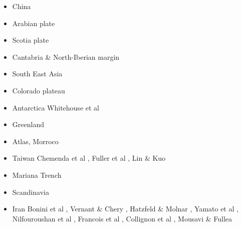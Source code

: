 \begin{itemize}
\item China 
{\scriptsize
\cite{zhst10}
\cite{wazh15}
\cite{guyr16}
\cite{dawl20}
}
\item Arabian plate 
{\scriptsize
\cite{rerl15}
}
\item Scotia plate 
{\scriptsize
\cite{necb13}
}
\item Cantabria \& North-Iberian margin 
{\scriptsize
\cite{clbb02}
\cite{peap15}
}
\item South East Asia 
{\scriptsize
\cite{rekv04}
\cite{yotr15}\cite{hasp15}\cite{meds15}
\cite{necg16}
}
\item Colorado plateau 
{\scriptsize
\cite{vabv10}
\cite{lesm11}
}
\item Antarctica  
{\scriptsize
\cite{huha07}
Whitehouse et al \cite{whbl12}
}
\item Greenland  
{\scriptsize
\cite{stsj15}\cite{heps15}\cite{stbl19}
}
\item Atlas, Morroco  
{\scriptsize
\cite{mica12}
\cite{kava14}
}
\item Taiwan  
{\scriptsize
Chemenda et al \cite{chys01}, Fuller et al \cite{fuwf06}, Lin \& Kuo \cite{liku16}
}
\item Mariana Trench  
{\scriptsize
\cite{zhlb15}
}
\item Scandinavia  
{\scriptsize
\cite{ramb80}
\cite{bovc14}
}
\item Iran
{\scriptsize
Bonini et al \cite{bocs03},
Vernant \&  Chery \cite{vech06},
Hatzfeld \& Molnar \cite{hamo10},
Yamato et al \cite{yakm11},
Nilfouroushan et al \cite{nipc13},
Francois et al \cite{frba14},
Collignon et al \cite{coyc16},
Mousavi \& Fullea \cite{mofu20}
} 




\end{itemize}






